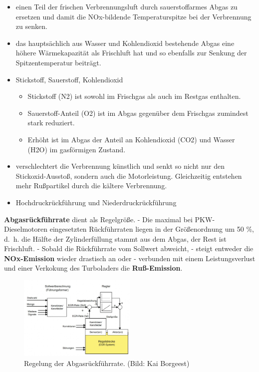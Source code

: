 \begin{itemize}
\item
  einen Teil der frischen Verbrennungsluft durch sauerstoffarmes Abgas
  zu ersetzen und damit die NOx-bildende Temperaturspitze bei der
  Verbrennung zu senken.
\item
  das hauptsächlich aus Wasser und Kohlendioxid bestehende Abgas eine
  höhere Wärmekapazität als Frischluft hat und so ebenfalls zur Senkung
  der Spitzentemperatur beiträgt.
\item
  Stickstoff, Sauerstoff, Kohlendioxid

  \begin{itemize}
  \item
    Stickstoff (N2) ist sowohl im Frischgas als auch im Restgas
    enthalten.
  \item
    Sauerstoff-Anteil (O2) ist im Abgas gegenüber dem Frischgas
    zumindest stark reduziert.
  \item
    Erhöht ist im Abgas der Anteil an Kohlendioxid (CO2) und Wasser
    (H2O) im gasförmigen Zustand.
  \end{itemize}
\item
  verschlechtert die Verbrennung künstlich und senkt so nicht nur den
  Stickoxid-Ausstoß, sondern auch die Motorleistung. Gleichzeitig
  entstehen mehr Rußpartikel durch die kältere Verbrennung.
\item
  Hochdruckrückführung und Niederdruckrückführung
\end{itemize}

\textbf{Abgasrückführrate} dient als Regelgröße. - Die maximal bei
PKW-Dieselmotoren eingesetzten Rückführraten liegen in der Größenordnung
um 50 \%, d.~h. die Hälfte der Zylinderfüllung stammt aus dem Abgas, der
Rest ist Frischluft. - Sobald die Rückführrate vom Sollwert abweicht, -
steigt entweder die \textbf{NOx-Emission} wieder drastisch an oder -
verbunden mit einem Leistungsverlust und einer Verkokung des Turboladers
die \textbf{Ruß-Emission}.

\begin{figure}[!ht]%
\centering
\includegraphics[width=0.5\textwidth]{images/EDC/EDC-10.pdf}
\caption{Regelung der Abgasrückführrate. (Bild: Kai Borgeest)}
\end{figure}

